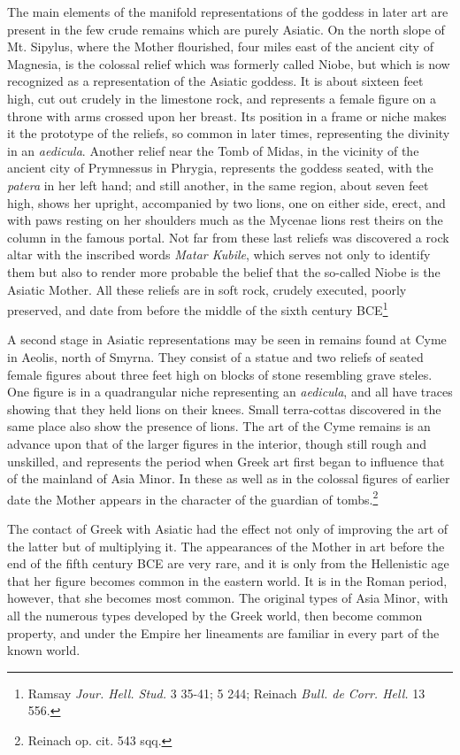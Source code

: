 \documentclass[a4paper, 11pt, oneside, polutonikogreek, english]{article}
\begin{document}
The main elements of the manifold representations of the goddess in later art are present in the few crude remains which are purely Asiatic. On the north slope of Mt. Sipylus, where the Mother flourished, four miles east of the ancient city of Magnesia, is the colossal relief which was formerly called Niobe, but which is now recognized as a representation of the Asiatic goddess. It is about sixteen feet high, cut out crudely in the limestone rock, and represents a female figure on a throne with arms crossed upon her breast. Its position in a frame or niche makes it the prototype of the reliefs, so common in later times, representing the divinity in an \emph{aedicula}. Another relief near the Tomb of Midas, in the vicinity of the ancient city of Prymnessus in Phrygia, represents the goddess seated, with the \emph{patera} in her left hand; and still another, in the same region, about seven feet high, shows her upright, accompanied by two lions, one on either side, erect, and with paws resting on her shoulders much as the Mycenae lions rest theirs on the column in the famous portal. Not far from these last reliefs was discovered a rock altar with the inscribed words \emph{Matar Kubile}, which serves not only to identify them but also to render more probable the belief that the so-called Niobe is the Asiatic Mother. All these reliefs are in soft rock, crudely executed, poorly preserved, and date from before the middle of the sixth century \textsc{BCE}\footnote{Ramsay \emph{Jour. Hell. Stud.} 3 35-41; 5 244; Reinach \emph{Bull. de Corr. Hell.} 13 556.}

A second stage in Asiatic representations may be seen in remains found at Cyme in Aeolis, north of Smyrna. They consist of a statue and two reliefs of seated female figures about three feet high on blocks of stone resembling grave steles. One figure is in a quadrangular niche representing an \emph{aedicula}, and all have traces showing that they held lions on their knees. Small terra-cottas discovered in the same place also show the presence of lions. The art of the Cyme remains is an advance upon that of the larger figures in the interior, though still rough and unskilled, and represents the period when Greek art first began to influence that of the mainland of Asia Minor. In these as well as in the colossal figures of earlier date the Mother appears in the character of the guardian of tombs.\footnote{Reinach op. cit. 543 sqq.}

The contact of Greek with Asiatic had the effect not only of improving the art of the latter but of multiplying it. The appearances of the Mother in art before the end of the fifth century \textsc{BCE} are very rare, and it is only from the Hellenistic age that her figure becomes common in the eastern world. It is in the Roman period, however, that she becomes most common. The original types of Asia Minor, with all the numerous types developed by the Greek world, then become common property, and under the Empire her lineaments are familiar in every part of the known world.
\end{document}
